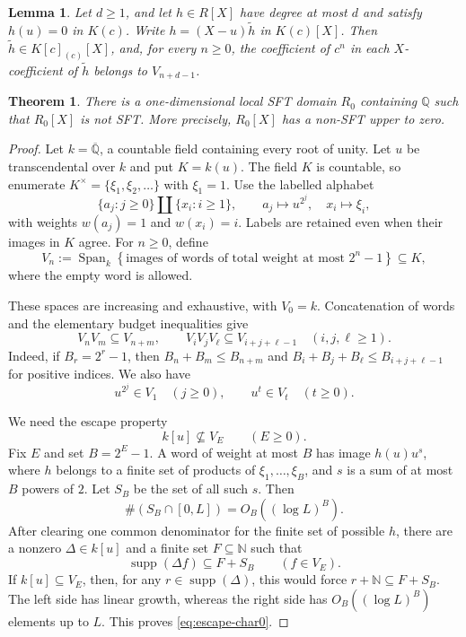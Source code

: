 \documentclass[10pt,a4paper]{amsart}
\newtheorem{lemma}{Lemma}
\newtheorem{theorem}{Theorem}
\newcommand{\Span}{\operatorname{Span}}
\begin{document}
\begin{lemma}\label{lem:division-char2}
Let $d\geq1$, and let $h\in R[X]$ have degree at most $d$ and satisfy
$h(u)=0$ in $K(c)$.  Write $h=(X-u)\widetilde h$ in $K(c)[X]$.  Then
$\widetilde h\in K[c]_{(c)}[X]$, and, for every $n\geq0$, the coefficient
of $c^n$ in each $X$-coefficient of $\widetilde h$ belongs to
$V_{n+d-1}$.
\end{lemma}

\begin{theorem}\label{thm:equicharacteristic-zero}
There is a one-dimensional local SFT domain $R_0$ containing $\mathbb Q$
such that $R_0[X]$ is not SFT.  More precisely, $R_0[X]$ has a non-SFT
upper to zero.
\end{theorem}

\begin{proof}
Let $k=\overline{\mathbb Q}$, a countable field containing every root of
unity.  Let $u$ be transcendental over $k$ and put $K=k(u)$.  The field $K$
is countable, so enumerate
$K^\times=\{\xi_1,\xi_2,\ldots\}$ with $\xi_1=1$.
Use the labelled alphabet
\[
  \{a_j:j\geq0\}\amalg\{x_i:i\geq1\},
  \qquad a_j\mapsto u^{2^j},\quad x_i\mapsto\xi_i,
\]
with weights $w(a_j)=1$ and $w(x_i)=i$.  Labels are retained even when
their images in $K$ agree.  For $n\geq0$, define
\begin{equation}\label{eq:V-char0}
 V_n:=\Span_k\left\{
  \text{images of words of total weight at most }2^n-1
 \right\}\subseteq K,
\end{equation}
where the empty word is allowed.

These spaces are increasing and exhaustive, with $V_0=k$.  Concatenation
of words and the elementary budget inequalities give
\begin{equation}\label{eq:filtration-char0}
 V_nV_m\subseteq V_{n+m},\qquad
 V_iV_jV_\ell\subseteq V_{i+j+\ell-1}\quad(i,j,\ell\geq1).
\end{equation}
Indeed, if $B_r=2^r-1$, then
$B_n+B_m\leq B_{n+m}$ and
$B_i+B_j+B_\ell\leq B_{i+j+\ell-1}$ for positive indices.  We also have
\begin{equation}\label{eq:powers-char0}
 u^{2^j}\in V_1\quad(j\geq0),\qquad u^t\in V_t\quad(t\geq0).
\end{equation}

We need the escape property
\begin{equation}\label{eq:escape-char0}
  k[u]\nsubseteq V_E\qquad(E\geq0).
\end{equation}
Fix $E$ and set $B=2^E-1$.  A word of weight at most $B$ has image
$h(u)u^s$, where $h$ belongs to a finite set of products of
$\xi_1,\ldots,\xi_B$, and $s$ is a sum of at most $B$ powers of $2$.
Let $S_B$ be the set of all such $s$.  Then
\[
  \#(S_B\cap[0,L])=O_B((\log L)^B).
\]
After clearing one common denominator for the finite set of possible $h$,
there are a nonzero $\Delta\in k[u]$ and a finite set $F\subseteq\mathbb N$
such that
\[
  \operatorname{supp}(\Delta f)\subseteq F+S_B\qquad(f\in V_E).
\]
If $k[u]\subseteq V_E$, then, for any
$r\in\operatorname{supp}(\Delta)$, this would force
$r+\mathbb N\subseteq F+S_B$.  The left side has linear growth, whereas
the right side has $O_B((\log L)^B)$ elements up to $L$.  This proves
\eqref{eq:escape-char0}.


\end{proof}
\end{document}
